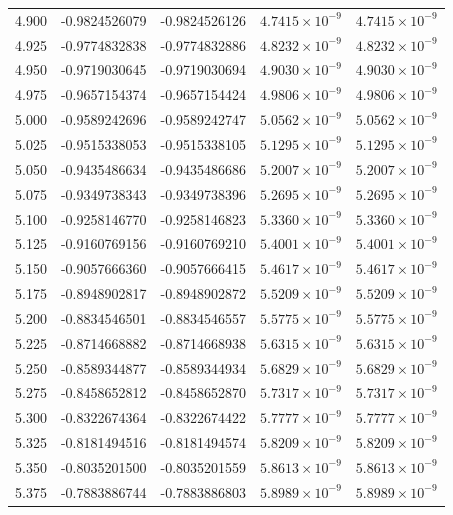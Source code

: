 \documentclass[11pt,a4paper]{article}
\begin{document}
\begin{longtable}{rrrrr}
4.900 & -0.9824526079 & -0.9824526126 & $4.7415\times 10^{-9}$ & $4.7415\times 10^{-9}$ \\
4.925 & -0.9774832838 & -0.9774832886 & $4.8232\times 10^{-9}$ & $4.8232\times 10^{-9}$ \\
4.950 & -0.9719030645 & -0.9719030694 & $4.9030\times 10^{-9}$ & $4.9030\times 10^{-9}$ \\
4.975 & -0.9657154374 & -0.9657154424 & $4.9806\times 10^{-9}$ & $4.9806\times 10^{-9}$ \\
5.000 & -0.9589242696 & -0.9589242747 & $5.0562\times 10^{-9}$ & $5.0562\times 10^{-9}$ \\
5.025 & -0.9515338053 & -0.9515338105 & $5.1295\times 10^{-9}$ & $5.1295\times 10^{-9}$ \\
5.050 & -0.9435486634 & -0.9435486686 & $5.2007\times 10^{-9}$ & $5.2007\times 10^{-9}$ \\
5.075 & -0.9349738343 & -0.9349738396 & $5.2695\times 10^{-9}$ & $5.2695\times 10^{-9}$ \\
5.100 & -0.9258146770 & -0.9258146823 & $5.3360\times 10^{-9}$ & $5.3360\times 10^{-9}$ \\
5.125 & -0.9160769156 & -0.9160769210 & $5.4001\times 10^{-9}$ & $5.4001\times 10^{-9}$ \\
5.150 & -0.9057666360 & -0.9057666415 & $5.4617\times 10^{-9}$ & $5.4617\times 10^{-9}$ \\
5.175 & -0.8948902817 & -0.8948902872 & $5.5209\times 10^{-9}$ & $5.5209\times 10^{-9}$ \\
5.200 & -0.8834546501 & -0.8834546557 & $5.5775\times 10^{-9}$ & $5.5775\times 10^{-9}$ \\
5.225 & -0.8714668882 & -0.8714668938 & $5.6315\times 10^{-9}$ & $5.6315\times 10^{-9}$ \\
5.250 & -0.8589344877 & -0.8589344934 & $5.6829\times 10^{-9}$ & $5.6829\times 10^{-9}$ \\
5.275 & -0.8458652812 & -0.8458652870 & $5.7317\times 10^{-9}$ & $5.7317\times 10^{-9}$ \\
5.300 & -0.8322674364 & -0.8322674422 & $5.7777\times 10^{-9}$ & $5.7777\times 10^{-9}$ \\
5.325 & -0.8181494516 & -0.8181494574 & $5.8209\times 10^{-9}$ & $5.8209\times 10^{-9}$ \\
5.350 & -0.8035201500 & -0.8035201559 & $5.8613\times 10^{-9}$ & $5.8613\times 10^{-9}$ \\
5.375 & -0.7883886744 & -0.7883886803 & $5.8989\times 10^{-9}$ & $5.8989\times 10^{-9}$ \\

\end{longtable}
\end{document}
